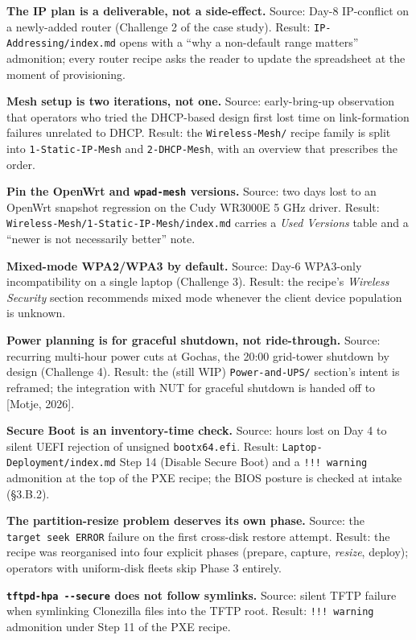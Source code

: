 \textbf{The IP plan is a deliverable, not a side-effect.} Source: Day-8
IP-conflict on a newly-added router (Challenge 2 of the case study).
Result: \texttt{IP-Addressing/index.md} opens with a ``why a non-default
range matters'' admonition; every router recipe asks the reader to
update the spreadsheet at the moment of provisioning.

\textbf{Mesh setup is two iterations, not one.} Source: early-bring-up
observation that operators who tried the DHCP-based design first lost
time on link-formation failures unrelated to DHCP. Result: the
\texttt{Wireless-Mesh/} recipe family is split into
\texttt{1-Static-IP-Mesh} and \texttt{2-DHCP-Mesh}, with an overview
that prescribes the order.

\textbf{Pin the OpenWrt and \texttt{wpad-mesh} versions.} Source: two
days lost to an OpenWrt snapshot regression on the Cudy WR3000E 5 GHz
driver. Result: \texttt{Wireless-Mesh/1-Static-IP-Mesh/index.md} carries
a \emph{Used Versions} table and a ``newer is not necessarily better''
note.

\textbf{Mixed-mode WPA2/WPA3 by default.} Source: Day-6 WPA3-only
incompatibility on a single laptop (Challenge 3). Result: the recipe's
\emph{Wireless Security} section recommends mixed mode whenever the
client device population is unknown.

\textbf{Power planning is for graceful shutdown, not ride-through.}
Source: recurring multi-hour power cuts at Gochas, the 20:00 grid-tower
shutdown by design (Challenge 4). Result: the (still WIP)
\texttt{Power-and-UPS/} section's intent is reframed; the integration
with NUT for graceful shutdown is handed off to {[}Motje, 2026{]}.

\textbf{Secure Boot is an inventory-time check.} Source: hours lost on
Day 4 to silent UEFI rejection of unsigned \texttt{bootx64.efi}. Result:
\texttt{Laptop-Deployment/index.md} Step 14 (Disable Secure Boot) and a
\texttt{!!!\ warning} admonition at the top of the PXE recipe; the BIOS
posture is checked at intake (§3.B.2).

\textbf{The partition-resize problem deserves its own phase.} Source:
the \texttt{target\ seek\ ERROR} failure on the first cross-disk restore
attempt. Result: the recipe was reorganised into four explicit phases
(prepare, capture, \emph{resize}, deploy); operators with uniform-disk
fleets skip Phase 3 entirely.

\textbf{\texttt{tftpd-hpa\ -\/-secure} does not follow symlinks.}
Source: silent TFTP failure when symlinking Clonezilla files into the
TFTP root. Result: \texttt{!!!\ warning} admonition under Step 11 of the
PXE recipe.

